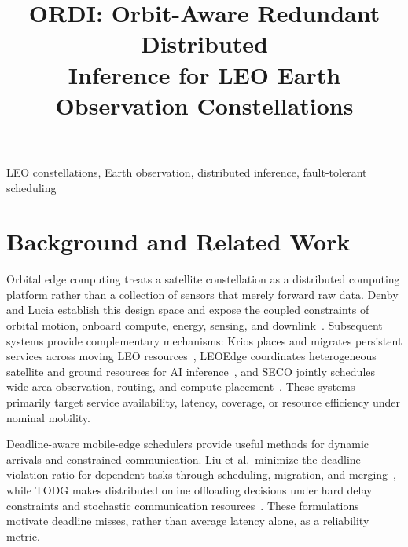 \documentclass[conference]{IEEEtran}
\newcommand{\ordi}{ORDI}
\begin{document}
\title{\ordi{}: Orbit-Aware Redundant Distributed\\Inference for LEO Earth Observation Constellations}

\author{
}

\maketitle

\begin{abstract}
\end{abstract}

\begin{IEEEkeywords}
LEO constellations, Earth observation, distributed inference, fault-tolerant scheduling
\end{IEEEkeywords}

\setcounter{section}{1}
\section{Background and Related Work}
\label{sec:motivation}

Orbital edge computing treats a satellite constellation as a distributed
computing platform rather than a collection of sensors that merely forward raw
data. Denby and Lucia establish this design space and expose the coupled
constraints of orbital motion, onboard compute, energy, sensing, and
downlink~\cite{denby2020oec}. Subsequent systems provide complementary
mechanisms: Krios places and migrates persistent services across moving LEO
resources~\cite{krios2024}, LEOEdge coordinates heterogeneous satellite and
ground resources for AI inference~\cite{leoedge2025}, and SECO jointly schedules
wide-area observation, routing, and compute placement~\cite{seco}. These systems
primarily target service availability, latency, coverage, or resource
efficiency under nominal mobility.

Deadline-aware mobile-edge schedulers provide useful methods for dynamic
arrivals and constrained communication. Liu et al.\ minimize the deadline
violation ratio for dependent tasks through scheduling, migration, and
merging~\cite{liu2023deadline}, while TODG makes distributed online offloading
decisions under hard delay constraints and stochastic communication
resources~\cite{yue2022todg}. These formulations motivate deadline misses,
rather than average latency alone, as a reliability metric.
\end{document}
